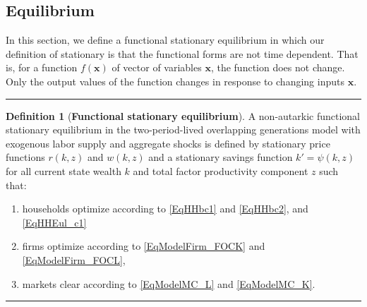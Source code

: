 \documentclass[letterpaper,12pt]{article}
\theoremstyle{definition}
\newtheorem{definition}{Definition} %
\begin{document}
\begin{spacing}{1.5}
  \subsection{Equilibrium}\label{SecModelEqlb}

    In this section, we define a functional stationary equilibrium in which our definition of stationary is that the functional forms are not time dependent. That is, for a function $f(\bm{x})$ of vector of variables $\bm{x}$, the function does not change. Only the output values of the function changes in response to changing inputs $\bm{x}$.

    \end{spacing}
    \vspace{5mm}
    \hrule
    \vspace{-1mm}
    \begin{definition}[\textbf{Functional stationary equilibrium}]\label{DefEqlb}
      A non-autarkic functional stationary equilibrium in the two-period-lived overlapping generations model with exogenous labor supply and aggregate shocks is defined by stationary price functions $r(k,z)$ and $w(k,z)$ and a stationary savings function $k'=\psi(k,z)$ for all current state wealth $k$ and total factor productivity component $z$ such that:
      \begin{enumerate}
        \item households optimize according to \eqref{EqHHbc1} and \eqref{EqHHbc2}, and \eqref{EqHHEul_c1}
        \item firms optimize according to \eqref{EqModelFirm_FOCK} and \eqref{EqModelFirm_FOCL},
        \item markets clear according to \eqref{EqModelMC_L} and \eqref{EqModelMC_K}.
      \end{enumerate}
    \end{definition}
    \vspace{-2mm}
    \hrule
    \vspace{5mm}
\end{document}
